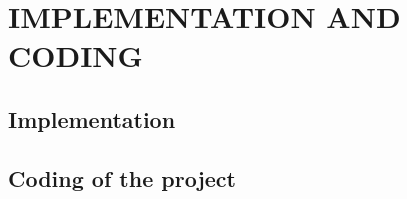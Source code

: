 \documentclass[main]{subfiles}
\begin{document}
\chapter{IMPLEMENTATION AND CODING}
\section{Implementation}
\section{Coding of the project}
\end{document}
